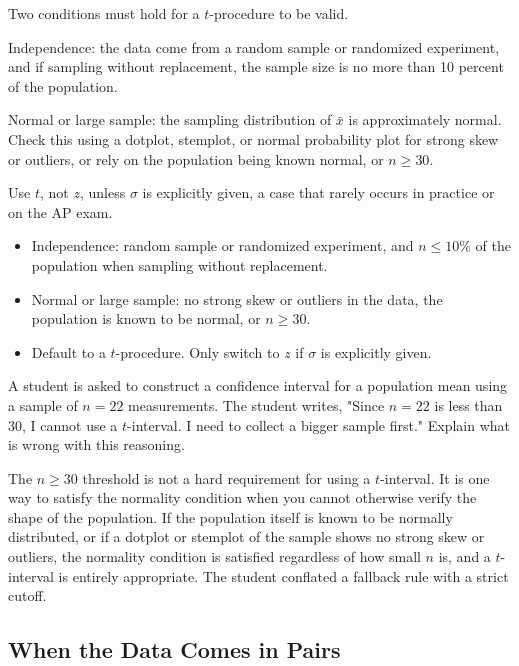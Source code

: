 Two conditions must hold for a $t$-procedure to be valid.

Independence: the data come from a random sample or randomized experiment, and if sampling without replacement, the sample size is no more than 10 percent of the population.

Normal or large sample: the sampling distribution of $\bar{x}$ is approximately normal. Check this using a dotplot, stemplot, or normal probability plot for strong skew or outliers, or rely on the population being known normal, or $n \geq 30$.

Use $t$, not $z$, unless $\sigma$ is explicitly given, a case that rarely occurs in practice or on the AP exam.

\begin{itemize}
    \item Independence: random sample or randomized experiment, and $n \leq 10\%$ of the population when sampling without replacement.
    \item Normal or large sample: no strong skew or outliers in the data, the population is known to be normal, or $n \geq 30$.
    \item Default to a $t$-procedure. Only switch to $z$ if $\sigma$ is explicitly given.
\end{itemize}

\begin{Exercise}[title={Spot the Error}, label={ex:means-conditions-error}]
A student is asked to construct a confidence interval for a population mean using a sample of $n = 22$ measurements. The student writes, "Since $n = 22$ is less than 30, I cannot use a $t$-interval. I need to collect a bigger sample first." Explain what is wrong with this reasoning.
\end{Exercise}

\begin{Answer}[ref={ex:means-conditions-error}]
The $n \geq 30$ threshold is not a hard requirement for using a $t$-interval. It is one way to satisfy the normality condition when you cannot otherwise verify the shape of the population. If the population itself is known to be normally distributed, or if a dotplot or stemplot of the sample shows no strong skew or outliers, the normality condition is satisfied regardless of how small $n$ is, and a $t$-interval is entirely appropriate. The student conflated a fallback rule with a strict cutoff.
\end{Answer}

\subsection{When the Data Comes in Pairs}

